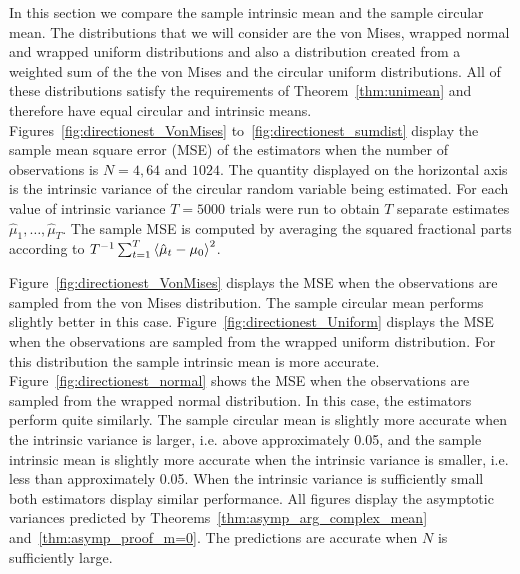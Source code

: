 \documentclass[journal]{IEEEtran}
\begin{document}
In this section we compare the sample intrinsic mean and the sample circular mean.  %
The distributions that we will consider are the von Mises, wrapped normal and wrapped uniform distributions \cite[Ch.~3]{Fisher1993}\cite[Ch.~3]{Mardia_directional_statistics}\cite[Ch.~4]{McKilliam2010thesis} and also a distribution created from a weighted sum of the the von Mises and the circular uniform distributions.  All of these distributions satisfy the requirements of Theorem~\ref{thm:unimean} and therefore have equal circular and intrinsic means.  %
Figures~\ref{fig:directionest_VonMises} to~\ref{fig:directionest_sumdist} display the sample mean square error (MSE) of the estimators when the number of observations is $N=4,64$ and $1024$. The quantity displayed on the horizontal axis is the intrinsic variance of the circular random variable being estimated. For each value of intrinsic variance $T = 5000$ trials were run to obtain $T$ separate estimates $\hat{\mu}_1, \dots, \hat{\mu}_{T}$. The sample MSE is computed by averaging the squared fractional parts according to $T^{-1}\sum_{t=1}^{T}\left<  \hat{\mu}_t - \mu_0 \right>^2$.

Figure~\ref{fig:directionest_VonMises} displays the MSE when the observations are sampled from the von Mises distribution. The sample circular mean performs slightly better in this case.  Figure~\ref{fig:directionest_Uniform} displays the MSE when the observations are sampled from the wrapped uniform distribution.  For this distribution the sample intrinsic mean is more accurate.  Figure~\ref{fig:directionest_normal} shows the MSE when the observations are sampled from the wrapped normal distribution.  In this case, the estimators perform quite similarly.  The sample circular mean is slightly more accurate when the intrinsic variance is larger, i.e. above approximately 0.05, and the sample intrinsic mean is slightly more accurate when the intrinsic variance is smaller, i.e. less than approximately 0.05.  When the intrinsic variance is sufficiently small both estimators display similar performance.  All figures display the asymptotic variances predicted by Theorems~\ref{thm:asymp_arg_complex_mean} and~\ref{thm:asymp_proof_m=0}.  The predictions are accurate when $N$ is sufficiently large.
\end{document}
